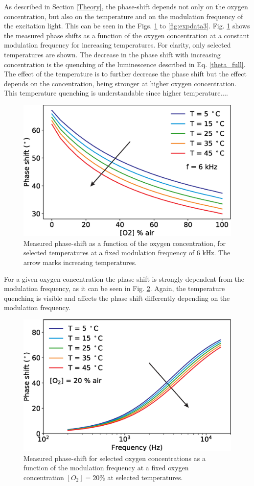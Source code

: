 \documentclass[9pt,twocolumn,twoside,pdftex]{optica}
\begin{document}
As described in Section \ref{Theory}, the phase-shift depends not only on the oxygen concentration, but also on the temperature and on the modulation frequency of the excitation light. This can be seen in the Figs. \ref{fig:expdata1} to \ref{fig:expdata3}.
Fig. \ref{fig:expdata1} shows the measured phase shifts as a function of the oxygen concentration at a constant modulation frequency for increasing temperatures. For clarity, only selected temperatures are shown. The decrease in the phase shift with increasing concentration is the quenching of the luminescence described in Eq. \ref{theta_full}. The effect of the temperature is to further decrease the phase shift but the effect depends on the concentration, being stronger at higher oxygen concentration. This temperature quenching is understandable since higher temperature.... 

\begin{figure}[htbp]
\centering
\includegraphics[width=8 cm]{phase_O2_T.eps}
\caption{Measured phase-shift as a function of the oxygen concentration, for selected temperatures at a fixed modulation frequency of 6 kHz. The arrow marks increasing temperatures.}
\label{fig:expdata1}
\end{figure}

For a given oxygen concentration the phase shift is strongly dependent from the modulation frequency, as it can be seen in Fig. \ref{fig:expdata2}. Again, the temperature quenching is visible and affects the phase shift differently depending on the modulation frequency.

\begin{figure}[htbp]
\centering
\includegraphics[width=8 cm]{phase_f_T.eps}
\caption{Measured phase-shift for selected oxygen concentrations as a function of the modulation frequency at a fixed oxygen concentration $[O_2]=20 \%$ at selected temperatures.}
\label{fig:expdata2}
\end{figure}
\end{document}
